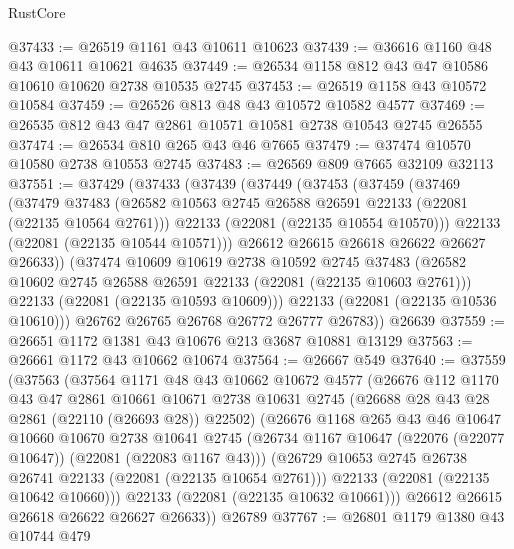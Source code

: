 \begin{lexlean}{RustCore}
\begin{coremodule}
@37433 := @26519 @1161 @43 @10611 @10623
@37439 := @36616 @1160 @48 @43 @10611 @10621 @4635
@37449 := @26534 @1158 @812 @43 @47 @10586 @10610 @10620 @2738 @10535 @2745
@37453 := @26519 @1158 @43 @10572 @10584
@37459 := @26526 @813 @48 @43 @10572 @10582 @4577
@37469 := @26535 @812 @43 @47 @2861 @10571 @10581 @2738 @10543 @2745 @26555
@37474 := @26534 @810 @265 @43 @46 @7665
@37479 := @37474 @10570 @10580 @2738 @10553 @2745
@37483 := @26569 @809 @7665 @32109 @32113
@37551 := @37429
    (@37433
      (@37439
        (@37449
          (@37453
            (@37459
              (@37469
                (@37479
                  @37483
                  (@26582 @10563 @2745 @26588 @26591 @22133 (@22081 (@22135 @10564 @2761)))
                  @22133
                  (@22081 (@22135 @10554 @10570)))
                @22133
                (@22081 (@22135 @10544 @10571)))
              @26612
              @26615
              @26618
              @26622
              @26627
              @26633))
          (@37474
            @10609
            @10619
            @2738
            @10592
            @2745
            @37483
            (@26582 @10602 @2745 @26588 @26591 @22133 (@22081 (@22135 @10603 @2761)))
            @22133
            (@22081 (@22135 @10593 @10609)))
          @22133
          (@22081 (@22135 @10536 @10610)))
        @26762
        @26765
        @26768
        @26772
        @26777
        @26783))
    @26639
@37559 := @26651 @1172 @1381 @43 @10676 @213 @3687 @10881 @13129
@37563 := @26661 @1172 @43 @10662 @10674
@37564 := @26667 @549
@37640 := @37559
    (@37563
      (@37564
        @1171
        @48
        @43
        @10662
        @10672
        @4577
        (@26676
          @112
          @1170
          @43
          @47
          @2861
          @10661
          @10671
          @2738
          @10631
          @2745
          (@26688 @28 @43 @28 @2861 (@22110 (@26693 @28)) @22502)
          (@26676
            @1168
            @265
            @43
            @46
            @10647
            @10660
            @10670
            @2738
            @10641
            @2745
            (@26734 @1167 @10647 (@22076 (@22077 @10647)) (@22081 (@22083 @1167 @43)))
            (@26729 @10653 @2745 @26738 @26741 @22133 (@22081 (@22135 @10654 @2761)))
            @22133
            (@22081 (@22135 @10642 @10660)))
          @22133
          (@22081 (@22135 @10632 @10661)))
        @26612
        @26615
        @26618
        @26622
        @26627
        @26633))
    @26789
@37767 := @26801
    @1179
    @1380
    @43
    @10744
    @479

\end{coremodule}
\end{lexlean}
